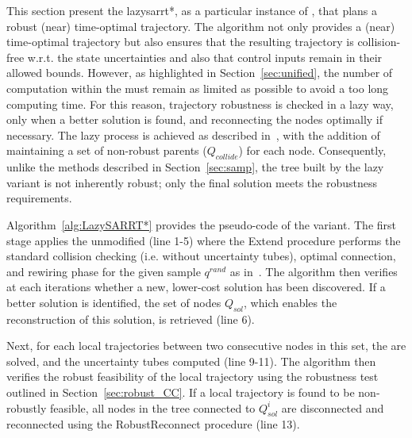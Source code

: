 This section present the \gls{lazysarrt*}, as a particular instance of , that plans a robust (near) time-optimal trajectory.
The algorithm not only provides a (near) time-optimal trajectory but also ensures that the resulting trajectory is collision-free w.r.t. the state uncertainties and also that control inputs remain in their allowed bounds.
However, as highlighted in Section~\ref{sec:unified}, the number of  computation within the  must remain as limited as possible to avoid a too long computing time. 
For this reason, trajectory robustness is checked in a lazy way, only when a better solution is found, and reconnecting the nodes optimally if necessary.
The lazy process is achieved as described in~\cite{cLazy1,cLazy2}, with the addition of maintaining a set of non-robust parents ($Q_{collide}$) for each node.
Consequently, unlike the  methods described in Section~\ref{sec:samp}, the tree built by the lazy variant is not inherently robust; only the final solution meets the robustness requirements.

Algorithm~\ref{alg:LazySARRT*} provides the pseudo-code of the  variant.  
The first stage applies the unmodified  (line 1-5) where the Extend procedure performs the standard collision checking (i.e. without uncertainty tubes), optimal connection, and rewiring phase for the given sample  $q^{rand}$ as in~\cite{cRRTstar}.
The algorithm then verifies at each iterations whether a new, lower-cost solution has been discovered. 
If a better solution is identified, the set of nodes $Q_{sol}$, which enables the reconstruction of this solution, is retrieved (line 6).

Next, for each local trajectories between two consecutive nodes in this set, the  are solved, and the uncertainty tubes computed (line 9-11).
The algorithm then verifies the robust feasibility of the local trajectory using the robustness test outlined in Section~\ref{sec:robust_CC}. 
If a local trajectory is found to be non-robustly feasible, all nodes in the tree connected to $Q_{sol}^i$ are disconnected and reconnected using the RobustReconnect procedure (line 13).

